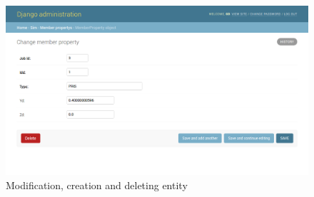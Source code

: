 \begin{figure}[h!]                                                      
\begin{center}                                                          
\includegraphics[scale=0.35]{images/admin4.png}                        
\caption{Modification, creation and deleting entity}                            
\end{center}                                                            
\end{figure} 
